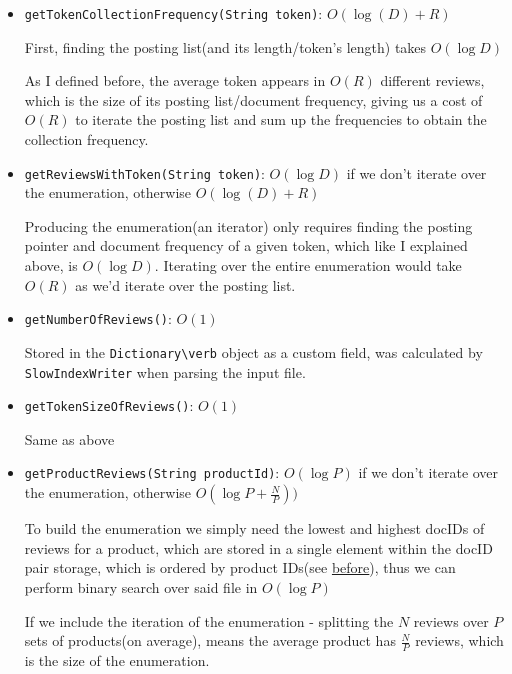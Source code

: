 \documentclass[11pt]{article}
\begin{document}
\begin{itemize}
    \item \verb+getTokenCollectionFrequency(String token)+: $O(\log(D) + R)$

	First, finding the posting list(and its length/token's length) takes $O(\log D)$
	
	As I defined before, the average token appears in $O(R)$ different reviews, which is
	the size of its posting list/document frequency, giving us a cost of $O(R)$ to
	iterate the posting list and sum up the frequencies to obtain the collection frequency.
	
    \item \verb+getReviewsWithToken(String token)+: $O(\log D)$ if we don't iterate over the enumeration, otherwise $O(\log(D) + R)$
    
    Producing the enumeration(an iterator) only requires finding the posting pointer and document frequency of a given token, which like I explained above,
    is $O(\log D)$. Iterating over the entire enumeration would take $O(R)$ as we'd iterate over the posting list.

    \item \verb+getNumberOfReviews()+: $O(1)$
    
    Stored in the \verb+Dictionary\verb+ object as a custom field, was calculated by \verb+SlowIndexWriter+ when parsing the input file.

    \item \verb+getTokenSizeOfReviews()+: $O(1)$
    
    Same as above

   \item \verb+getProductReviews(String productId)+: $O(\log P)$ if we don't iterate over the enumeration, otherwise $O(\log P + \frac{N}{P}))$
   
 
   To build the enumeration we simply need the lowest and highest docIDs of reviews for a product, which are stored in a single element within the docID
   pair storage, which is ordered by product IDs(see \hyperref[sec:pairStorage]{before}), thus we can perform binary search over said file in $O(\log P)$
   
   If we include the iteration of the enumeration - splitting the $N$ reviews over $P$ sets of products(on average), means the average product has
   $\frac{N}{P}$ reviews, which is the size of the enumeration.

\end{itemize}
\end{document}
